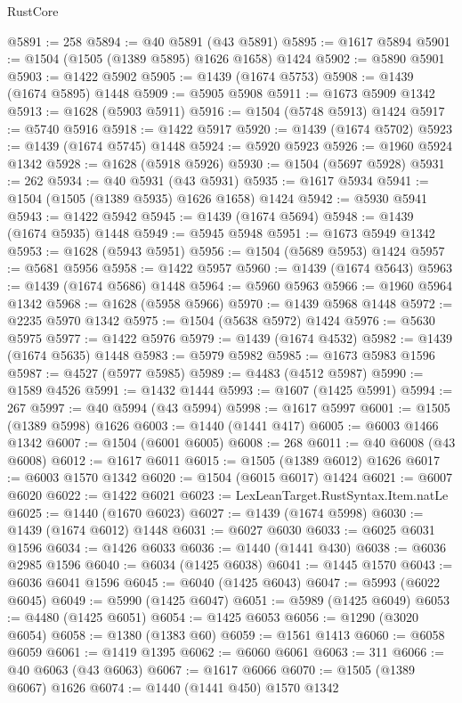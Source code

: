 \begin{lexlean}{RustCore}
\begin{coremodule}
@5891 := 258
@5894 := @40 @5891 (@43 @5891)
@5895 := @1617 @5894
@5901 := @1504 (@1505 (@1389 @5895) @1626 @1658) @1424
@5902 := @5890 @5901
@5903 := @1422 @5902
@5905 := @1439 (@1674 @5753)
@5908 := @1439 (@1674 @5895) @1448
@5909 := @5905 @5908
@5911 := @1673 @5909 @1342
@5913 := @1628 (@5903 @5911)
@5916 := @1504 (@5748 @5913) @1424
@5917 := @5740 @5916
@5918 := @1422 @5917
@5920 := @1439 (@1674 @5702)
@5923 := @1439 (@1674 @5745) @1448
@5924 := @5920 @5923
@5926 := @1960 @5924 @1342
@5928 := @1628 (@5918 @5926)
@5930 := @1504 (@5697 @5928)
@5931 := 262
@5934 := @40 @5931 (@43 @5931)
@5935 := @1617 @5934
@5941 := @1504 (@1505 (@1389 @5935) @1626 @1658) @1424
@5942 := @5930 @5941
@5943 := @1422 @5942
@5945 := @1439 (@1674 @5694)
@5948 := @1439 (@1674 @5935) @1448
@5949 := @5945 @5948
@5951 := @1673 @5949 @1342
@5953 := @1628 (@5943 @5951)
@5956 := @1504 (@5689 @5953) @1424
@5957 := @5681 @5956
@5958 := @1422 @5957
@5960 := @1439 (@1674 @5643)
@5963 := @1439 (@1674 @5686) @1448
@5964 := @5960 @5963
@5966 := @1960 @5964 @1342
@5968 := @1628 (@5958 @5966)
@5970 := @1439 @5968 @1448
@5972 := @2235 @5970 @1342
@5975 := @1504 (@5638 @5972) @1424
@5976 := @5630 @5975
@5977 := @1422 @5976
@5979 := @1439 (@1674 @4532)
@5982 := @1439 (@1674 @5635) @1448
@5983 := @5979 @5982
@5985 := @1673 @5983 @1596
@5987 := @4527 (@5977 @5985)
@5989 := @4483 (@4512 @5987)
@5990 := @1589 @4526
@5991 := @1432 @1444
@5993 := @1607 (@1425 @5991)
@5994 := 267
@5997 := @40 @5994 (@43 @5994)
@5998 := @1617 @5997
@6001 := @1505 (@1389 @5998) @1626
@6003 := @1440 (@1441 @417)
@6005 := @6003 @1466 @1342
@6007 := @1504 (@6001 @6005)
@6008 := 268
@6011 := @40 @6008 (@43 @6008)
@6012 := @1617 @6011
@6015 := @1505 (@1389 @6012) @1626
@6017 := @6003 @1570 @1342
@6020 := @1504 (@6015 @6017) @1424
@6021 := @6007 @6020
@6022 := @1422 @6021
@6023 := LexLeanTarget.RustSyntax.Item.natLe
@6025 := @1440 (@1670 @6023)
@6027 := @1439 (@1674 @5998)
@6030 := @1439 (@1674 @6012) @1448
@6031 := @6027 @6030
@6033 := @6025 @6031 @1596
@6034 := @1426 @6033
@6036 := @1440 (@1441 @430)
@6038 := @6036 @2985 @1596
@6040 := @6034 (@1425 @6038)
@6041 := @1445 @1570
@6043 := @6036 @6041 @1596
@6045 := @6040 (@1425 @6043)
@6047 := @5993 (@6022 @6045)
@6049 := @5990 (@1425 @6047)
@6051 := @5989 (@1425 @6049)
@6053 := @4480 (@1425 @6051)
@6054 := @1425 @6053
@6056 := @1290 (@3020 @6054)
@6058 := @1380 (@1383 @60)
@6059 := @1561 @1413
@6060 := @6058 @6059
@6061 := @1419 @1395
@6062 := @6060 @6061
@6063 := 311
@6066 := @40 @6063 (@43 @6063)
@6067 := @1617 @6066
@6070 := @1505 (@1389 @6067) @1626
@6074 := @1440 (@1441 @450) @1570 @1342

\end{coremodule}
\end{lexlean}
